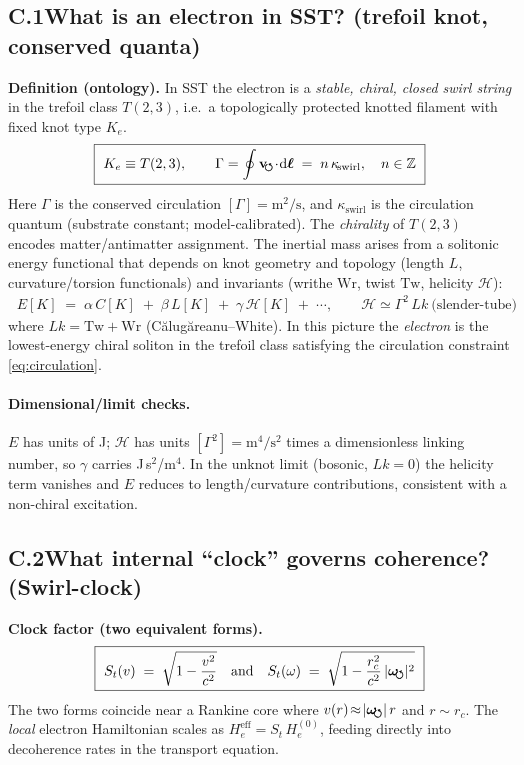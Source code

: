 \documentclass[aps,prb,preprint,amsmath,amssymb]{revtex4-2} %
\newcommand{\vswirl}{\mathbf{v}_{\!\mkern-2mu\scriptstyle\boldsymbol{\circlearrowleft}}}
\newcommand{\omegas}{\boldsymbol{\omega}_{\!\mkern-2mu\scriptstyle\boldsymbol{\circlearrowleft}}}
\newcommand{\rc}{r_c}
\begin{document}
    \subsection*{C.1\quad What is an electron in SST? (trefoil knot, conserved quanta)}
        \textbf{Definition (ontology).} In SST the electron is a \emph{stable, chiral, closed swirl string} in the trefoil class \(T(2,3)\), i.e.\ a topologically protected knotted filament with fixed knot type \(K_e\).
        \begin{align}
            \boxed{\ K_e \equiv T(2,3),\qquad \Gamma=\oint \vswirl\!\cdot\!\dd\boldsymbol{\ell}\;=\;n\,\kappa_{\!\text{swirl}},\quad n\in\mathbb{Z}\ }
            \label{eq:circulation}
        \end{align}
        Here \(\Gamma\) is the conserved circulation \([\Gamma]=\mathrm{m^2/s}\), and \(\kappa_{\!\text{swirl}}\) is the circulation quantum (substrate constant; model-calibrated). The \emph{chirality} of \(T(2,3)\) encodes matter/antimatter assignment. The inertial mass arises from a solitonic energy functional that depends on knot geometry and topology (length \(L\), curvature/torsion functionals) and invariants (writhe \(\mathrm{Wr}\), twist \(\mathrm{Tw}\), helicity \(\mathcal H\)):
        \begin{align}
            \boxed{\ E[K]\;=\;\alpha\,C[K]\;+\;\beta\,L[K]\;+\;\gamma\,\mathcal H[K]\;+\;\cdots,\qquad
            \mathcal H \simeq \Gamma^{2}\,Lk \ \text{(slender-tube)}\ }
            \label{eq:energy-fn}
        \end{align}
        where \(Lk=\mathrm{Tw}+\mathrm{Wr}\) (Călugăreanu–White). In this picture the \emph{electron} is the lowest-energy chiral soliton in the trefoil class satisfying the circulation constraint \eqref{eq:circulation}.

        \paragraph*{Dimensional/limit checks.}
            \(E\) has units of J; \(\mathcal H\) has units \([\Gamma^2]=\mathrm{m^4/s^2}\) times a dimensionless linking number, so \(\gamma\) carries J\,s\(^2\)/m\(^4\). In the unknot limit (bosonic, \(Lk=0\)) the helicity term vanishes and \(E\) reduces to length/curvature contributions, consistent with a non-chiral excitation.

        \subsection*{C.2\quad What internal “clock” governs coherence? (Swirl-clock)}
        \textbf{Clock factor (two equivalent forms).}
        \begin{align}
            \boxed{\ S_t(v)\;=\;\sqrt{1-\frac{v^2}{c^2}}\quad\text{and}\quad
            S_t(\omega)\;=\;\sqrt{1-\frac{\rc^{2}}{c^{2}}\,|\omegas|^{2}}\ }
            \label{eq:clock}
        \end{align}
        The two forms coincide near a Rankine core where \(v(r)\!\approx\!|\omegas|\,r\) and \(r\!\sim\!\rc\). The \emph{local} electron Hamiltonian scales as \(H_e^\textrm{eff}=S_t\,H_e^{(0)}\), feeding directly into decoherence rates in the transport equation.
\end{document}
